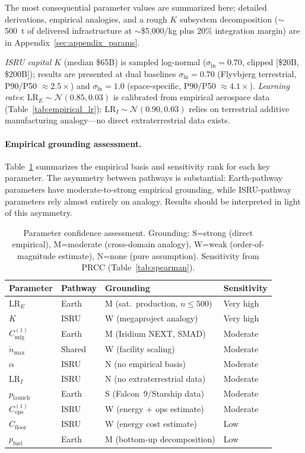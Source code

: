 \documentclass[preprint,12pt]{elsarticle}
\begin{document}
The most consequential parameter values are summarized here; detailed derivations, empirical analogies, and a rough $K$ subsystem decomposition (${\sim}$500~t of delivered infrastructure at ${\sim}$\$5{,}000/kg plus 20\% integration margin) are in Appendix~\ref{sec:appendix_params}.

\emph{ISRU capital $K$} (median \$65B) is sampled log-normal ($\sigma_{\ln} = 0.70$, clipped [\$20B, \$200B]); results are presented at dual baselines $\sigma_{\ln} = 0.70$ (Flyvbjerg terrestrial, P90/P50 $\approx 2.5\times$) and $\sigma_{\ln} = 1.0$ (space-specific, P90/P50 $\approx 4.1\times$). \emph{Learning rates}: $\mathrm{LR}_E \sim \mathcal{N}(0.85, 0.03)$ is calibrated from empirical aerospace data (Table~\ref{tab:empirical_lr}); $\mathrm{LR}_I \sim \mathcal{N}(0.90, 0.03)$ relies on terrestrial additive manufacturing analogy---no direct extraterrestrial data exists.

\paragraph{Empirical grounding assessment.} Table~\ref{tab:confidence} summarizes the empirical basis and sensitivity rank for each key parameter. The asymmetry between pathways is substantial: Earth-pathway parameters have moderate-to-strong empirical grounding, while ISRU-pathway parameters rely almost entirely on analogy. Results should be interpreted in light of this asymmetry.

\begin{table}[htbp]
\centering
\caption{Parameter confidence assessment. Grounding: S=strong (direct empirical), M=moderate (cross-domain analogy), W=weak (order-of-magnitude estimate), N=none (pure assumption). Sensitivity from PRCC (Table~\ref{tab:spearman}).}
\label{tab:confidence}
\small
\begin{tabular}{@{}llll@{}}
\toprule
Parameter & Pathway & Grounding & Sensitivity \\
\midrule
$\mathrm{LR}_E$ & Earth & M (sat.\ production, $n\leq500$) & Very high \\
$K$ & ISRU & W (megaproject analogy) & Very high \\
$C_{\mathrm{mfg}}^{(1)}$ & Earth & M (Iridium NEXT, SMAD) & Moderate \\
$\dot{n}_{\max}$ & Shared & W (facility scaling) & Moderate \\
$\alpha$ & ISRU & N (no empirical basis) & Moderate \\
$\mathrm{LR}_I$ & ISRU & N (no extraterrestrial data) & Moderate \\
$p_{\mathrm{launch}}$ & Earth & S (Falcon~9/Starship data) & Moderate \\
$C_{\mathrm{ops}}^{(1)}$ & ISRU & W (energy + ops estimate) & Moderate \\
$C_{\mathrm{floor}}$ & ISRU & W (energy cost estimate) & Low \\
$p_{\mathrm{fuel}}$ & Earth & M (bottom-up decomposition) & Low \\
\bottomrule
\end{tabular}
\end{table}
\end{document}
